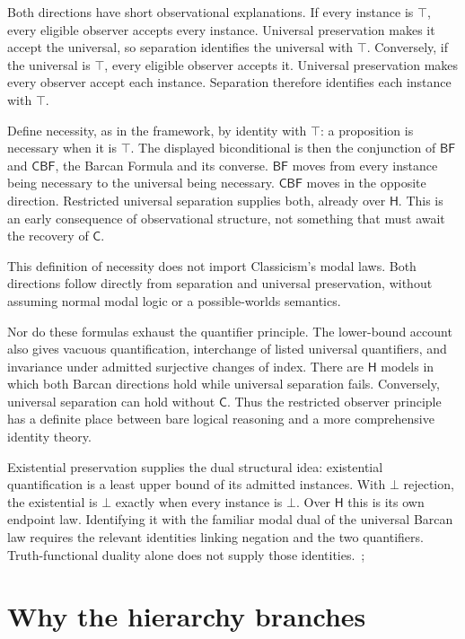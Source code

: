 \documentclass[12pt,letterpaper]{article}
\newcommand{\Hlogic}{\mathsf{H}}
\newcommand{\C}{\mathsf{C}}
\newcommand{\BF}{\mathsf{BF}}
\newcommand{\CBF}{\mathsf{CBF}}
\begin{document}
Both directions have short observational explanations. If every instance is $\top$, every eligible observer accepts every instance. Universal preservation makes it accept the universal, so separation identifies the universal with $\top$. Conversely, if the universal is $\top$, every eligible observer accepts it. Universal preservation makes every observer accept each instance. Separation therefore identifies each instance with $\top$.


Define necessity, as in the framework, by identity with $\top$: a proposition is necessary when it is $\top$. The displayed biconditional is then the conjunction of $\BF$ and $\CBF$, the Barcan Formula and its converse. $\BF$ moves from every instance being necessary to the universal being necessary. $\CBF$ moves in the opposite direction. Restricted universal separation supplies both, already over $\Hlogic$. This is an early consequence of observational structure, not something that must await the recovery of $\C$.


This definition of necessity does not import Classicism's modal laws. Both directions follow directly from separation and universal preservation, without assuming normal modal logic or a possible-worlds semantics.


Nor do these formulas exhaust the quantifier principle. The lower-bound account also gives vacuous quantification, interchange of listed universal quantifiers, and invariance under admitted surjective changes of index. There are $\Hlogic$ models in which both Barcan directions hold while universal separation fails. Conversely, universal separation can hold without $\C$. Thus the restricted observer principle has a definite place between bare logical reasoning and a more comprehensive identity theory.~\cite[\S\S3--5]{r3}


Existential preservation supplies the dual structural idea: existential quantification is a least upper bound of its admitted instances. With $\bot$ rejection, the existential is $\bot$ exactly when every instance is $\bot$. Over $\Hlogic$ this is its own endpoint law. Identifying it with the familiar modal dual of the universal Barcan law requires the relevant identities linking negation and the two quantifiers. Truth-functional duality alone does not supply those identities.~\cite[\S2]{r2};~\cite[\S2]{r4}


\section{Why the hierarchy branches}
\end{document}
